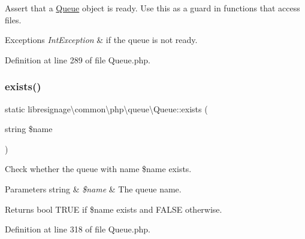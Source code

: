 Assert that a \hyperlink{classlibresignage_1_1common_1_1php_1_1queue_1_1Queue}{Queue} object is ready. Use this as a guard in functions that access files.


\begin{DoxyExceptions}{Exceptions}
{\em Int\+Exception} & if the queue is not ready. \\
\hline
\end{DoxyExceptions}


Definition at line 289 of file Queue.\+php.

\mbox{\label{classlibresignage_1_1common_1_1php_1_1queue_1_1Queue_a75c2ca8bcc10f0aa4b3e4988708562e1}} 
\subsubsection{\texorpdfstring{exists()}{exists()}}
{\footnotesize\ttfamily static libresignage\textbackslash{}common\textbackslash{}php\textbackslash{}queue\textbackslash{}\+Queue\+::exists (\begin{DoxyParamCaption}\item[{string}]{\$name }\end{DoxyParamCaption})\hspace{0.3cm}{\ttfamily [static]}}

Check whether the queue with name \$name exists.


\begin{DoxyParams}[1]{Parameters}
string & {\em \$name} & The queue name.\\
\hline
\end{DoxyParams}
\begin{DoxyReturn}{Returns}
bool T\+R\+UE if \$name exists and F\+A\+L\+SE otherwise. 
\end{DoxyReturn}


Definition at line 318 of file Queue.\+php.

\mbox{\label{classlibresignage_1_1common_1_1php_1_1queue_1_1Queue_a776564394ff5efaa2915a11d44fc939f}} 

